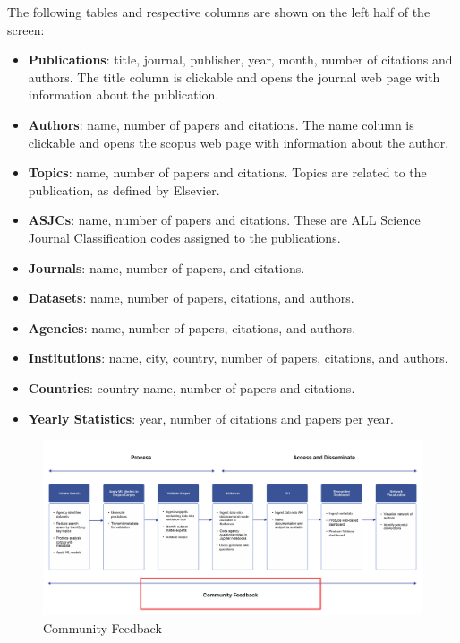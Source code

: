\documentclass[titlepage, 11pt]{article}
\begin{document}
{\begin{description}
\end{description}

The following tables and respective columns are shown on the left half of the screen:

\begin{itemize}
    \item \textbf{Publications}: title, journal, publisher, year, month, number of citations and authors. The title column is clickable and opens the journal web page with information about the publication.
    \item \textbf{Authors}: name, number of papers and citations. The name column is clickable and opens the scopus web page with information about the author.
    \item \textbf{Topics}: name, number of papers and citations. Topics are related to the publication, as defined by Elsevier.
    \item \textbf{ASJCs}: name, number of papers and citations. These are ALL Science Journal Classification codes assigned to the publications. 
    \item \textbf{Journals}: name, number of papers, and citations.
    \item \textbf{Datasets}: name, number of papers, citations, and authors.
    \item \textbf{Agencies}: name, number of papers, citations, and authors.
    \item \textbf{Institutions}: name, city, country, number of papers, citations, and authors.
    \item \textbf{Countries}: country name, number of papers and citations.
    \item \textbf{Yearly Statistics}: year, number of citations and papers per year.
\end{itemize}

\begin{figure}
  \includegraphics[scale=0.20]{Feedback.png}
  \vspace{-2.5ex}
  \caption{Community Feedback}
    \vspace{-0.97ex}
  \label{fig:feedback}
\end{figure}


}
\end{document}
